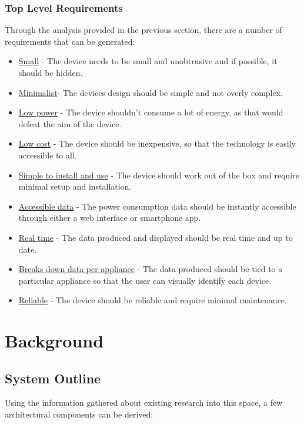 \documentclass[preprint,12pt,3p]{elsarticle}
\begin{document}
\subsubsection{Top Level Requirements}

Through the analysis provided in the previous section, there are a number of requirements that can be generated:

\begin{itemize}
  \item \underline{Small} - The device needs to be small and unobtrusive and if possible, it should be hidden.
  \item \underline{Minimalist}- The devices design should be simple and not overly complex.
  \item \underline{Low power} - The device shouldn't consume a lot of energy, as that would defeat the aim of the device.
  \item \underline{Low cost} - The device should be inexpensive, so that the technology is easily accessible to all.
  \item \underline{Simple to install and use} - The device should work out of the box and require minimal setup and installation.
  \item \underline{Accessible data}  - The power consumption data should be instantly accessible through either a web interface or smartphone app.
  \item \underline{Real time} - The data produced and displayed should be real time and up to date.
  \item \underline{Breaks down data per appliance} - The data produced should be tied to a particular appliance so that the user can visually identify each device.
  \item \underline{Reliable} - The device should be reliable and require minimal maintenance.
\end{itemize}

\clearpage
\section{Background}
\subsection{System Outline}
Using the information gathered about existing research into this space, a few architectural components can be derived:
\end{document}
